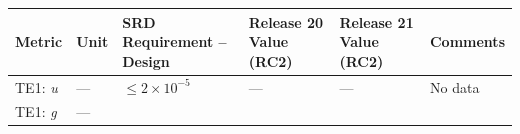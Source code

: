 \documentclass[DM,toc]{lsstdoc}
\begin{document}
\begin{longtable}[]{@{}llllll@{}}
\toprule
\begin{minipage}[b]{0.12\columnwidth}\raggedright\strut
Metric\strut
\end{minipage} & \begin{minipage}[b]{0.06\columnwidth}\raggedright\strut
Unit\strut
\end{minipage} & \begin{minipage}[b]{0.14\columnwidth}\raggedright\strut
SRD Requirement -- Design\strut
\end{minipage} & \begin{minipage}[b]{0.12\columnwidth}\raggedright\strut
Release 20 Value (RC2) \strut
\end{minipage} & \begin{minipage}[b]{0.12\columnwidth}\raggedright\strut
Release 21 Value (RC2) \strut
\end{minipage} & \begin{minipage}[b]{0.17\columnwidth}\raggedright\strut
Comments\strut
\end{minipage}\tabularnewline
\midrule
\endhead
\begin{minipage}[t]{0.12\columnwidth}\raggedright\strut
TE1: \emph{u}\strut
\end{minipage} & \begin{minipage}[t]{0.06\columnwidth}\raggedright\strut
---\strut
\end{minipage} & \begin{minipage}[t]{0.14\columnwidth}\raggedright\strut
\(\leq 2\times10^{-5}\)\strut
\end{minipage} & \begin{minipage}[t]{0.12\columnwidth}\raggedright\strut
---\strut
\end{minipage} & \begin{minipage}[t]{0.12\columnwidth}\raggedright\strut
--- \strut
\end{minipage} & \begin{minipage}[t]{0.17\columnwidth}\raggedright\strut
No data\strut
\end{minipage}\tabularnewline
\begin{minipage}[t]{0.12\columnwidth}\raggedright\strut
TE1: \emph{g}\strut
\end{minipage} & \begin{minipage}[t]{0.06\columnwidth}\raggedright\strut
---\strut
\end{minipage} & \begin{minipage}[t]{0.14\columnwidth}\raggedright\strut

\end{minipage}
\end{longtable}
\end{document}
